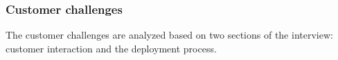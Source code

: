 \documentclass[english]{tktltiki2}
\theoremstyle{definition}
\theoremstyle{remark}
\begin{document}





\subsubsection{Customer challenges}
The customer challenges are analyzed based on two sections of the interview: customer interaction and the deployment process. 
\end{document}
